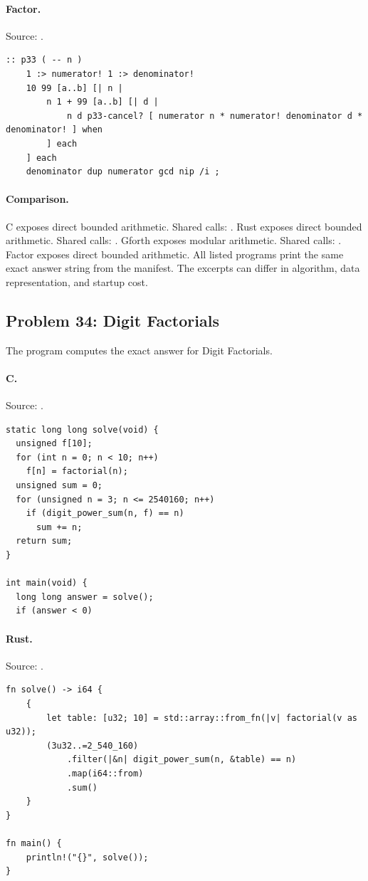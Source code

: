 \paragraph{Factor.} Source: .
\begin{lstlisting}
:: p33 ( -- n )
    1 :> numerator! 1 :> denominator!
    10 99 [a..b] [| n |
        n 1 + 99 [a..b] [| d |
            n d p33-cancel? [ numerator n * numerator! denominator d * denominator! ] when
        ] each
    ] each
    denominator dup numerator gcd nip /i ;
\end{lstlisting}

\paragraph{Comparison.}
C exposes direct bounded arithmetic. Shared calls: \texttt{}. Rust exposes direct bounded arithmetic. Shared calls: \texttt{}. Gforth exposes modular arithmetic. Shared calls: \texttt{}. Factor exposes direct bounded arithmetic.
All listed programs print the same exact answer string from the manifest. The excerpts can differ in algorithm, data representation, and startup cost.

\subsection{Problem 34: Digit Factorials}
\label{walkthrough:p34}
The program computes the exact answer for Digit Factorials.

\paragraph{C.} Source: .
\begin{lstlisting}
static long long solve(void) {
  unsigned f[10];
  for (int n = 0; n < 10; n++)
    f[n] = factorial(n);
  unsigned sum = 0;
  for (unsigned n = 3; n <= 2540160; n++)
    if (digit_power_sum(n, f) == n)
      sum += n;
  return sum;
}

int main(void) {
  long long answer = solve();
  if (answer < 0)
\end{lstlisting}

\paragraph{Rust.} Source: .
\begin{lstlisting}
fn solve() -> i64 {
    {
        let table: [u32; 10] = std::array::from_fn(|v| factorial(v as u32));
        (3u32..=2_540_160)
            .filter(|&n| digit_power_sum(n, &table) == n)
            .map(i64::from)
            .sum()
    }
}

fn main() {
    println!("{}", solve());
}
\end{lstlisting}

